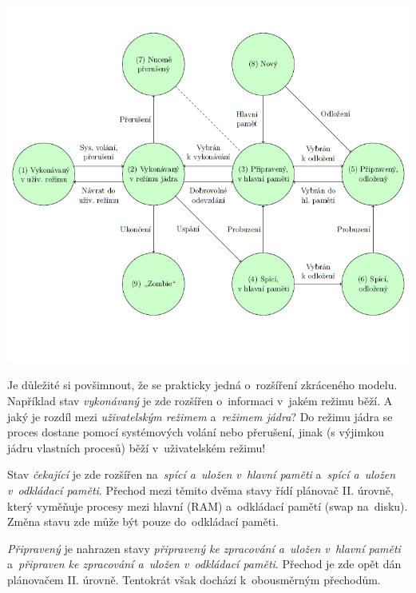 \begin{center}
    \includegraphics[scale=0.9]{images/proc_extended_states.png}
\end{center}

Je důležité si povšimnout, že se prakticky jedná o~rozšíření zkráceného modelu. Například stav \emph{vykonávaný} je zde rozšířen o~informaci v~jakém režimu běží. A jaký je rozdíl mezi \emph{uživatelským režimem} a~\emph{režimem jádra}? Do režimu jádra se proces dostane pomocí systémových volání nebo přerušení, jinak (s výjimkou jádru vlastních procesů) běží v~uživatelském režimu!

\vspace{0,5cm}

Stav \emph{čekající} je zde rozšířen na~\emph{spící a~uložen v~hlavní paměti} a~\emph{spící a~uložen v~odkládací paměti}. Přechod mezi těmito dvěma stavy řídí plánovač II. úrovně, který vyměňuje procesy mezi hlavní (RAM) a~odkládací pamětí (swap na~disku). Změna stavu zde může být pouze do~odkládací paměti. 

\vspace{0,5cm}

\emph{Připravený} je nahrazen stavy \emph{připravený ke zpracování a~uložen v~hlavní paměti} a~\emph{připraven ke zpracování a~uložen v~odkládací paměti}. Přechod je zde opět dán plánovačem II. úrovně. Tentokrát však dochází k~obousměrným přechodům. 

\vspace{0,5cm}

